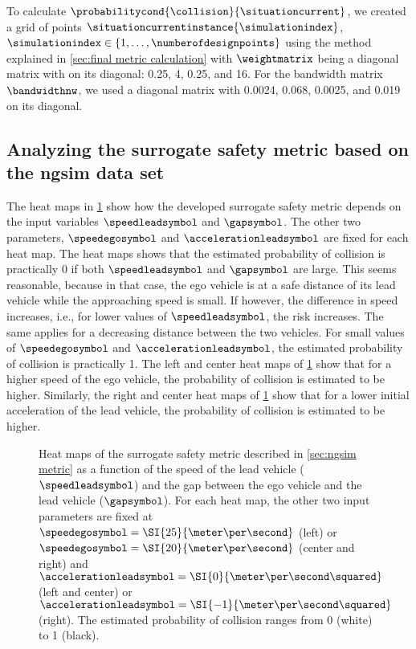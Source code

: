 To calculate $\probabilitycond{\collision}{\situationcurrent}$, we created a grid of points $\situationcurrentinstance{\simulationindex}$, $\simulationindex\in\{1,\ldots,\numberofdesignpoints\}$ using the method explained in \cref{sec:final metric calculation} with $\weightmatrix$ being a diagonal matrix with on its diagonal: 0.25, 4, 0.25, and 16.
For the bandwidth matrix $\bandwidthnw$, we used a diagonal matrix with 0.0024, 0.068, 0.0025, and 0.019 on its diagonal.



\subsection{Analyzing the surrogate safety metric based on the \acs{ngsim} data set}
\label{sec:analyzing ngsim metric}

The heat maps in \cref{fig:heatmaps} show how the developed surrogate safety metric depends on the input variables $\speedleadsymbol$ and $\gapsymbol$. 
The other two parameters, $\speedegosymbol$ and $\accelerationleadsymbol$ are fixed for each heat map.
The heat maps shows that the estimated probability of collision is practically 0 if both $\speedleadsymbol$ and $\gapsymbol$ are large.
This seems reasonable, because in that case, the ego vehicle is at a safe distance of its lead vehicle while the approaching speed is small. 
If however, the difference in speed increases, i.e., for lower values of $\speedleadsymbol$, the risk increases. 
The same applies for a decreasing distance between the two vehicles.
For small values of $\speedegosymbol$ and $\accelerationleadsymbol$, the estimated probability of collision is practically 1.
The left and center heat maps of \cref{fig:heatmaps} show that for a higher speed of the ego vehicle, the probability of collision is estimated to be higher.
Similarly, the right and center heat maps of \cref{fig:heatmaps} show that for a lower initial acceleration of the lead vehicle, the probability of collision is estimated to be higher.

\setlength{\figurewidth}{.35\linewidth}
\setlength{\figureheight}{0.8\figurewidth}
\begin{figure}
	\centering
	
	\caption{Heat maps of the surrogate safety metric described in \cref{sec:ngsim metric} as a function of the speed of the lead vehicle ($\speedleadsymbol$) and the gap between the ego vehicle and the lead vehicle ($\gapsymbol$).
		For each heat map, the other two input parameters are fixed at $\speedegosymbol=\SI{25}{\meter\per\second}$ (left) or $\speedegosymbol=\SI{20}{\meter\per\second}$ (center and right) and $\accelerationleadsymbol=\SI{0}{\meter\per\second\squared}$ (left and center) or $\accelerationleadsymbol=\SI{-1}{\meter\per\second\squared}$ (right).
		The estimated probability of collision ranges from 0 (white) to 1 (black).}
	\label{fig:heatmaps}
\end{figure}

